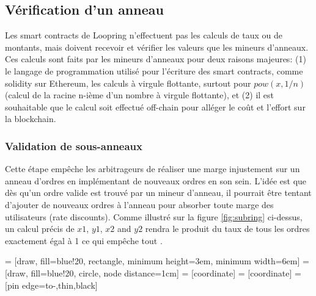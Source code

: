 \documentclass[UTF8,nofonts]{article}
\makeatletter
\newenvironment{figurehere}
 {\def\@captype{figure}}
 {}
\makeatother
\begin{document}
\begin{multicols}{2}
\subsection{Vérification d'un anneau\label{sec:ring_verification}}

Les smart contracts de Loopring n'effectuent pas les calculs de taux ou de montants, mais doivent recevoir et vérifier les valeurs que les mineurs d'anneaux. Ces calculs sont faits par les mineurs d'anneaux pour deux raisons majeures: (1) le langage de programmation utilisé pour l'écriture des smart contracts, comme solidity\cite{dannen2017introducing} sur Ethereum, les calculs à virgule flottante, surtout pour $pow(x, 1/n)$ (calcul de la racine n-ième d'un nombre à virgule flottante), et (2) il est souhaitable que le calcul soit effectué off-chain pour alléger  le coût et l'effort sur la blockchain.


\subsubsection{Validation de sous-anneaux\label{sec:sub_ring_check}}
Cette étape empêche les arbitrageurs de réaliser une marge injustement sur un anneau d'ordres en implémentant de nouveaux ordres en son sein. L'idée est que dès qu'un ordre valide est trouvé par un mineur d'anneau, il pourrait être tentant d'ajouter de nouveaux ordres à l'anneau pour absorber toute marge des utilisateurs (rate discounts). Comme illustré sur la figure \ref{fig:subring} ci-dessus, un calcul précis de $x1$, $y1$, $x2$ and $y2$ rendra le produit du taux de tous les ordres exactement égal à 1 ce qui empêche tout . 

\begin{center}
\begin{figurehere}
\centering
{} = [draw, fill=blue!20, rectangle, 
    minimum height=3em, minimum width=6em]
 = [draw, fill=blue!20, circle, node distance=1cm]
 = [coordinate]
 = [coordinate]
 = [pin edge={to-,thin,black}]

\end{figurehere}
\end{center}
\end{multicols}
\end{document}
